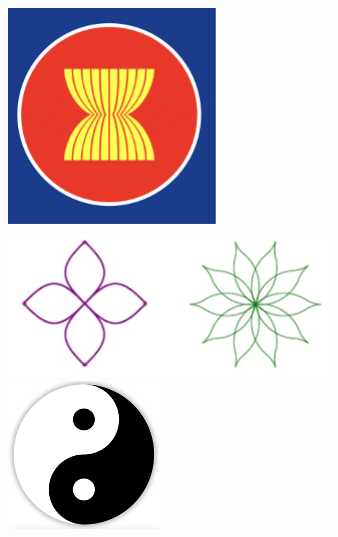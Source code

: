 \begin{multicols}{2}
\begin{figure}[H]
		\includegraphics[width= 1\linewidth]{Picture14}
		\includegraphics[width= 1\linewidth]{Picture15}
		\includegraphics[width= 1\linewidth]{Picture16}

\end{figure}
\end{multicols}
